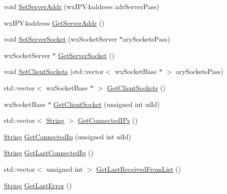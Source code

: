 \begin{DoxyCompactItemize}
\item 
void \hyperlink{class_rad_j_a_v_1_1_networking_1_1wx_widgets_t_c_p_server_af1f01bbea328dbb2024f49ea0a078300}{Set\+Server\+Addr} (wx\+I\+P\+V4address adr\+Server\+Pass)
\item 
wx\+I\+P\+V4address \hyperlink{class_rad_j_a_v_1_1_networking_1_1wx_widgets_t_c_p_server_a95f0ce3c74eaa8e5482b7a47c3c4afd4}{Get\+Server\+Addr} ()
\item 
void \hyperlink{class_rad_j_a_v_1_1_networking_1_1wx_widgets_t_c_p_server_a3e088be7abe0d7306546bc76f665a24e}{Set\+Server\+Socket} (wx\+Socket\+Server $\ast$ary\+Sockets\+Pass)
\item 
wx\+Socket\+Server $\ast$ \hyperlink{class_rad_j_a_v_1_1_networking_1_1wx_widgets_t_c_p_server_ad4131a0658edc2d70ee89221e6fa417a}{Get\+Server\+Socket} ()
\item 
void \hyperlink{class_rad_j_a_v_1_1_networking_1_1wx_widgets_t_c_p_server_afdbe6afcd98c24ca8c5284dfd60a7682}{Set\+Client\+Sockets} (std\+::vector$<$ wx\+Socket\+Base $\ast$ $>$ ary\+Sockets\+Pass)
\item 
std\+::vector$<$ wx\+Socket\+Base $\ast$ $>$ \hyperlink{class_rad_j_a_v_1_1_networking_1_1wx_widgets_t_c_p_server_a7bb7ecbbb9b2c6a363bbf972eb3a1626}{Get\+Client\+Sockets} ()
\item 
wx\+Socket\+Base $\ast$ \hyperlink{class_rad_j_a_v_1_1_networking_1_1wx_widgets_t_c_p_server_abccb4388bb5da5f597c9be492f93b45e}{Get\+Client\+Socket} (unsigned int ui\+Id)
\item 
std\+::vector$<$ \hyperlink{class_rad_j_a_v_1_1_string}{String} $>$ \hyperlink{class_rad_j_a_v_1_1_networking_1_1wx_widgets_t_c_p_server_a34eace4489a5e639b9480ea307daf16d}{Get\+Connected\+I\+Ps} ()
\item 
\hyperlink{class_rad_j_a_v_1_1_string}{String} \hyperlink{class_rad_j_a_v_1_1_networking_1_1wx_widgets_t_c_p_server_a5fd51ffee2812c7b94a5ffcd97f24f04}{Get\+Connected\+Ip} (unsigned int ui\+Id)
\item 
\hyperlink{class_rad_j_a_v_1_1_string}{String} \hyperlink{class_rad_j_a_v_1_1_networking_1_1wx_widgets_t_c_p_server_a9b53e846668e7a9c99e95a4d5ea1e6ec}{Get\+Last\+Connected\+Ip} ()
\item 
std\+::vector$<$ unsigned int $>$ \hyperlink{class_rad_j_a_v_1_1_networking_1_1wx_widgets_t_c_p_server_a8c5c5a3f9fcabd44b003259ef55ba599}{Get\+Last\+Received\+From\+List} ()
\item 
\hyperlink{class_rad_j_a_v_1_1_string}{String} \hyperlink{class_rad_j_a_v_1_1_networking_1_1wx_widgets_t_c_p_server_a1d60f5ce0c16c5788fb9b9cb1fe0fa88}{Get\+Last\+Error} ()

\end{DoxyCompactItemize}
